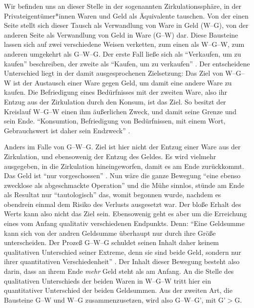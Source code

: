 \documentclass[12pt,
               paper=a4,
               twoside=false,
               onehalfspacing,
               bibliography=totoc,
               toc=graduated,
               ]{scrartcl}
\newcommand{\pc}[2]{\parencite[#1]{#2}}
\newcommand{\vgl}[2]{\parencite[vgl.][#1]{#2}}
\newcommand{\gwg}{G--W--G'\xspace}
\newcommand{\wgw}{W--G--W\xspace}
\begin{document}


Wir befinden uns an dieser Stelle in der sogenannten
Zirkulationssphäre, in der Privateigentümer*innen Waren und Geld als
Äquivalente tauschen. Von der einen Seite stellt sich dieser Tausch
als Verwandlung von Ware in Geld (W--G), von der anderen Seite als
Verwandlung von Geld in Ware (G--W) dar. Diese Bausteine lassen sich
auf zwei verschiedene Weisen verketten, zum einen als \wgw, zum
anderen umgekehrt als G--W--G. Der erste Fall ließe sich als
"`Verkaufen, um zu kaufen"' beschreiben, der zweite als "`Kaufen, um
zu verkaufen"' \vgl{162}{kap}. Der entscheidene Unterschied liegt in
der damit ausgesprochenen Zielsetzung: Das Ziel von \wgw ist der
Austausch einer Ware gegen Geld, um damit eine andere Ware zu kaufen.
Die Befriedigung eines Bedürfnisses mit der zweiten Ware, also ihr
Entzug aus der Zirkulation durch den Konsum, ist das Ziel. So besitzt
der Kreislauf \wgw einen ihm äußerlichen Zweck, und damit seine Grenze
und sein Ende. "`Konsumtion, Befriedigung von Bedürfnissen, mit einem
Wort, Gebrauchswert ist daher sein Endzweck"' \pc{164}{kap}.


Anders im Falle von G--W--G. Ziel ist hier nicht der Entzug einer Ware
aus der Zirkulation, und ebensowenig der Entzug des Geldes. Es wird
vielmehr ausgegeben, in die Zirkulation hineingeworfen, damit es am
Ende zurückkommt. Das Geld ist "`nur vorgeschossen"' \pc{163}{kap}.
Nun wäre die ganze Bewegung "`eine ebenso zwecklose als abgeschmackte
Operation"' \pc{165}{kap} und die Mühe sinnlos, stünde am Ende als
Resultat nur "`tautologisch"' \pc{164}{kap} das, womit begonnen wurde,
nachdem es obendrein einmal dem Risiko des Verlusts ausgesetzt war.
Der bloße Erhalt des Werts kann also nicht das Ziel sein. Ebensowenig
geht es aber um die Erreichung eines vom Anfang qualitativ verschiedenen
Endpunkts. Denn: "`Eine Geldsumme kann sich von der andren Geldsumme
überhaupt nur durch ihre Größe unterscheiden. Der Prozeß G--W--G
schuldet seinen Inhalt daher keinem qualitativen Unterschied seiner
Extreme, denn sie sind beide Geld, sondern nur ihrer quantitativen
Verschiedenheit"' \pc{165}{kap}. Der Inhalt dieser Bewegung besteht
also darin, dass an ihrem Ende \emph{mehr} Geld steht als am Anfang.
An die Stelle des qualitativen Unterschieds der beiden Waren in \wgw
tritt hier ein quantitativer Unterschied der beiden Geldsummen. Aus
der zweiten Art, die Bausteine G--W und W--G zusammenzusetzen, wird
also \gwg, mit G'$>$G.
\end{document}
